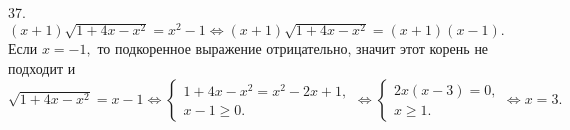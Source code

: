 37. $(x+1)\sqrt{1+4x-x^2}=x^2-1\Leftrightarrow (x+1)\sqrt{1+4x-x^2}=(x+1)(x-1).$ Если $x=-1,$ то подкоренное выражение отрицательно, значит этот корень не подходит и $\sqrt{1+4x-x^2}=x-1\Leftrightarrow\begin{cases}1+4x-x^2=x^2-2x+1,\\ x-1\geqslant0.\end{cases}
\Leftrightarrow\begin{cases}2x(x-3)=0,\\ x\geqslant1.\end{cases}\Leftrightarrow
x=3.$\\
